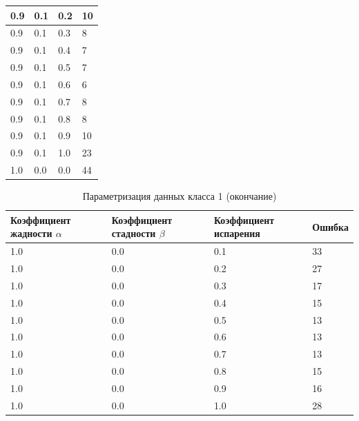 \documentclass{bmstu}[a4paper]
\begin{document}
\begin{longtable}{|p{}|p{}|p{}|p{}|}
	0.9 &  0.1 &  0.2 &    10 \\\hline
	0.9 &  0.1 &  0.3 &     8 \\\hline
	0.9 &  0.1 &  0.4 &     7 \\\hline
	0.9 &  0.1 &  0.5 &     7 \\\hline
	0.9 &  0.1 &  0.6 &     6 \\\hline
	0.9 &  0.1 &  0.7 &     8 \\\hline
	0.9 &  0.1 &  0.8 &     8 \\\hline
	0.9 &  0.1 &  0.9 &    10 \\\hline
	0.9 &  0.1 &  1.0 &    23 \\\hline
	1.0 &  0.0 &  0.0 &    44 \\\hline
\end{longtable}

\begin{longtable}{|p{}|p{}|p{}|p{}|}
	\caption{Параметризация данных класса 1 (окончание)}\label{tbl:b_log_end}  \\\hline
	Коэффициент жадности $\alpha$ & Коэффициент стадности $\beta$ & Коэффициент испарения & Ошибка   \\\hline
	\endfirsthead
	1.0 &  0.0 &  0.1 &    33 \\\hline
	1.0 &  0.0 &  0.2 &    27 \\\hline
	1.0 &  0.0 &  0.3 &    17 \\\hline
	1.0 &  0.0 &  0.4 &    15 \\\hline
	1.0 &  0.0 &  0.5 &    13 \\\hline
	1.0 &  0.0 &  0.6 &    13 \\\hline
	1.0 &  0.0 &  0.7 &    13 \\\hline
	1.0 &  0.0 &  0.8 &    15 \\\hline
	1.0 &  0.0 &  0.9 &    16 \\\hline
	1.0 &  0.0 &  1.0 &    28 \\\hline
\end{longtable}
\end{document}
